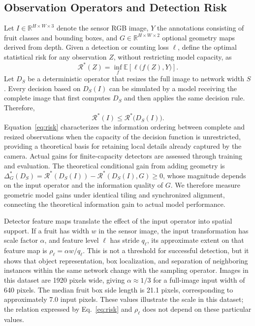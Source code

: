 \documentclass[11pt,a4paper]{article}
\begin{document}
\subsection{Observation Operators and Detection Risk}
\label{sec:observation}
Let $I\in\mathbb{R}^{H\times W\times3}$ denote the sensor RGB image, $Y$ the annotations consisting of fruit classes and bounding boxes, and $G\in\mathbb{R}^{H\times W\times2}$ optional geometry maps derived from depth. Given a detection or counting loss $\ell$, define the optimal statistical risk for any observation $Z$, without restricting model capacity, as
\begin{equation}
\mathcal{R}^{*}(Z)=\inf_{f}\mathbb{E}\!\left[\ell\bigl(f(Z),Y\bigr)\right].
\end{equation}
Let $D_S$ be a deterministic operator that resizes the full image to network width $S$. Every decision based on $D_S(I)$ can be simulated by a model receiving the complete image that first computes $D_S$ and then applies the same decision rule. Therefore,
\begin{equation}
\mathcal{R}^{*}(I)\leq\mathcal{R}^{*}\!\bigl(D_S(I)\bigr).
\label{eq:risk}
\end{equation}
Equation~\eqref{eq:risk} characterizes the information ordering between complete and resized observations when the capacity of the decision function is unrestricted, providing a theoretical basis for retaining local details already captured by the camera. Actual gains for finite-capacity detectors are assessed through training and evaluation. The theoretical conditional gain from adding geometry is $\Delta_G^{*}(D_S)=\mathcal{R}^{*}(D_S(I))-\mathcal{R}^{*}(D_S(I),G)\geq0$, whose magnitude depends on the input operator and the information quality of $G$. We therefore measure geometric model gains under identical tiling and synchronized alignment, connecting the theoretical information gain to actual model performance.

Detector feature maps translate the effect of the input operator into spatial support. If a fruit has width $w$ in the sensor image, the input transformation has scale factor $\alpha$, and feature level $\ell$ has stride $q_\ell$, its approximate extent on that feature map is $\rho_\ell=\alpha w/q_\ell$. This is not a threshold for successful detection, but it shows that object representation, box localization, and separation of neighboring instances within the same network change with the sampling operator. Images in this dataset are 1920 pixels wide, giving $\alpha\approx1/3$ for a full-image input width of 640 pixels. The median fruit box side length is 21.1 pixels, corresponding to approximately 7.0 input pixels. These values illustrate the scale in this dataset; the relation expressed by Eq.~\eqref{eq:risk} and $\rho_\ell$ does not depend on these particular values.
\end{document}
